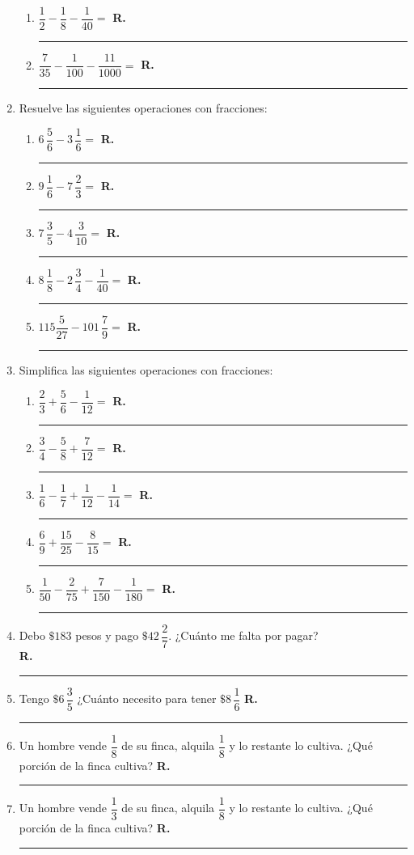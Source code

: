 \begin{enumerate}
\begin{enumerate}[label=\alph*)]
\item $\dfrac{1}{2} - \dfrac{1}{8} - \dfrac{1}{40} =$ \textbf{R.} \rule{3cm}{0.1mm} 
\item $\dfrac{7}{35} - \dfrac{1}{100} - \dfrac{11}{1000} =$ \textbf{R.} \rule{3cm}{0.1mm} 
\end{enumerate}
\item Resuelve las siguientes operaciones con fracciones:
\begin{enumerate}[label=\alph*)]
\item $6 \, \dfrac{5}{6} - 3 \, \dfrac{1}{6} =$ \textbf{R.} \rule{3cm}{0.1mm} 
\item $9 \, \dfrac{1}{6} - 7 \, \dfrac{2}{3} =$ \textbf{R.} \rule{3cm}{0.1mm} 
\item $7 \, \dfrac{3}{5} - 4 \, \dfrac{3}{10} =$ \textbf{R.} \rule{3cm}{0.1mm} 
\item $8 \, \dfrac{1}{8} - 2 \, \dfrac{3}{4} - \dfrac{1}{40} =$ \textbf{R.} \rule{3cm}{0.1mm} 
\item $115 \dfrac{5}{27} - 101 \, \dfrac{7}{9} =$ \textbf{R.} \rule{3cm}{0.1mm} 
\end{enumerate}
\item Simplifica las siguientes operaciones con fracciones:
\begin{enumerate}[label=\alph*)]
\item $\dfrac{2}{3} + \dfrac{5}{6} - \dfrac{1}{12}=$ \textbf{R.} \rule{3cm}{0.1mm} 
\item $\dfrac{3}{4} - \dfrac{5}{8} + \dfrac{7}{12} =$ \textbf{R.} \rule{3cm}{0.1mm} 
\item $\dfrac{1}{6} - \dfrac{1}{7} + \dfrac{1}{12} - \dfrac{1}{14} =$ \textbf{R.} \rule{3cm}{0.1mm} 
\item $\dfrac{6}{9} + \dfrac{15}{25} - \dfrac{8}{15} =$ \textbf{R.} \rule{3cm}{0.1mm} 
\item $\dfrac{1}{50} - \dfrac{2}{75} + \dfrac{7}{150} - \dfrac{1}{180} =$ \textbf{R.} \rule{3cm}{0.1mm} 
\end{enumerate}
\item Debo $\$ 183$ pesos y pago $\$42 \, \dfrac{2}{7}$. ¿Cuánto me falta por pagar? \\ \textbf{R.} \rule{3cm}{0.1mm} 
\item Tengo $\$ 6 \, \dfrac{3}{5}$ ¿Cuánto necesito para tener $\$ 8 \, \dfrac{1}{6}$ \textbf{R.} \rule{3cm}{0.1mm} 
\item Un hombre vende $\dfrac{1}{8}$ de su finca, alquila $\dfrac{1}{8}$ y lo restante lo cultiva. ¿Qué porción de la finca cultiva? \textbf{R.} \rule{3cm}{0.1mm}  
\item Un hombre vende $\dfrac{1}{3}$ de su finca, alquila $\dfrac{1}{8}$ y lo restante lo cultiva. ¿Qué porción de la finca cultiva? \textbf{R.} \rule{3cm}{0.1mm}  
\end{enumerate}
